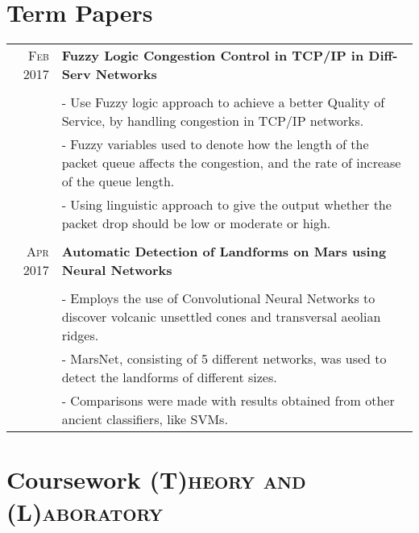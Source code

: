 \documentclass[a4paper,10pt]{extarticle} %
\begin{document}


\section{Term Papers}

\begin{tabular}{r|p{18cm}}

\textsc{Feb 2017} & \textbf{Fuzzy Logic Congestion Control in TCP/IP in Diff-Serv Networks}\\
\\
& \footnotesize{- Use Fuzzy logic approach to achieve a better Quality of Service, by handling congestion in TCP/IP networks.}\\
& \footnotesize{- Fuzzy variables used to denote how the length of the packet queue affects the congestion, and the rate of increase of
the queue length. }\\
& \footnotesize{- Using linguistic approach to give the output whether the packet drop should be low or moderate or high.
}\\
\multicolumn{2}{c}{} \\
\textsc{Apr 2017} & \textbf{Automatic Detection of Landforms on Mars using Neural Networks}\\
\\
& \footnotesize{- Employs the use of Convolutional Neural Networks to discover volcanic unsettled cones and transversal aeolian ridges.}\\
& \footnotesize{- MarsNet, consisting of 5 different networks, was used to detect the landforms of different sizes. }\\
& \footnotesize{- Comparisons were made with results obtained from other ancient classifiers, like SVMs. }
\multicolumn{2}{c}{} \\

\end{tabular}

\newpage
\vspace*{0.3cm}

 \section{Coursework
 \hfill\small\textsc{(T)heory and (L)aboratory}}
\end{document}
